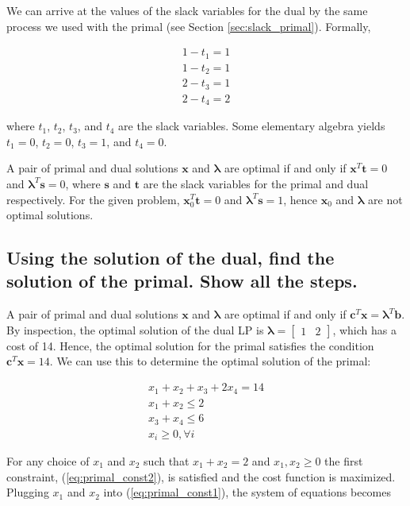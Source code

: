 \documentclass{article}
\begin{document}
We can arrive at the values of the slack variables for the dual by the same process we used with the primal (see Section \ref{sec:slack_primal}). Formally,

\begin{align*}
1 - t_1 = 1\\
1 - t_2 = 1\\
2 - t_3 = 1\\
2 - t_4 = 2
\end{align*}

\noindent where $t_1$, $t_2$, $t_3$, and $t_4$ are the slack variables. Some elementary algebra yields $t_1 = 0$, $t_2 = 0$, $t_3 = 1$, and $t_4 = 0$.

A pair of primal and dual solutions $\mathbf{x}$ and $\boldsymbol{\lambda}$ are optimal if and only if $\mathbf{x}^T \mathbf{t} = 0$ and $\boldsymbol{\lambda}^T \mathbf{s} = 0$, where $\mathbf{s}$ and $\mathbf{t}$ are the slack variables for the primal and dual respectively.
For the given problem, $\mathbf{x}_0^T \mathbf{t} = 0$ and $\boldsymbol{\lambda}^T \mathbf{s} = 1$, hence $\mathbf{x}_0$ and $\boldsymbol{\lambda}$ are not optimal solutions.

\subsection{Using the solution of the dual, find the solution of the primal. Show all the steps.}

A pair of primal and dual solutions $\mathbf{x}$ and $\boldsymbol{\lambda}$ are optimal if and only if $\mathbf{c}^T \mathbf{x} = \boldsymbol{\lambda}^T \mathbf{b}$.
By inspection, the optimal solution of the dual LP is $\boldsymbol{\lambda} = \begin{bmatrix}1 & 2\end{bmatrix}$, which has a cost of 14.
Hence, the optimal solution for the primal satisfies the condition $\mathbf{c}^T \mathbf{x} = 14$.
We can use this to determine the optimal solution of the primal:

\begin{align} \label{eq:primal_const1}
x_1 + x_2 + x_3 + 2x_4 = 14\\\label{eq:primal_const2}
x_1 + x_2 \le 2\\\label{eq:primal_const3}
x_3 + x_4 \le 6\\
x_i \ge 0, \forall i
\end{align}

\noindent For any choice of $x_1$ and $x_2$ such that $x_1 + x_2 = 2$ and $x_1, x_2 \ge 0$ the first constraint, (\ref{eq:primal_const2}), is satisfied and the cost function is maximized.
Plugging $x_1$ and $x_2 $ into (\ref{eq:primal_const1}), the system of equations becomes
\end{document}
